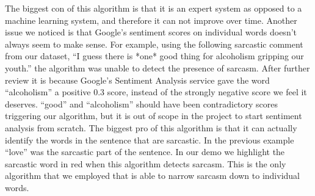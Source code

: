 \documentclass[conference]{IEEEtran}
\begin{document}
The biggest con of this algorithm is that it is an expert system as opposed to a machine learning system, and therefore it can not improve over time. Another issue we noticed is that Google’s sentiment scores on individual words doesn’t always seem to make sense. For example, using the following sarcastic comment from our dataset, “I guess there is *one* good thing for alcoholism gripping our youth.” the algorithm was unable to detect the presence of sarcasm. After further review it is because Google’s Sentiment Analysis service gave the word “alcoholism” a positive 0.3 score, instead of the strongly negative score we feel it deserves. “good” and “alcoholism” should have been contradictory scores triggering our algorithm, but it is out of scope in the project to start sentiment analysis from scratch. The biggest pro of this algorithm is that it can actually identify the words in the sentence that are sarcastic. In the previous example “love” was the sarcastic part of the sentence. In our demo we highlight the sarcastic word in red when this algorithm detects sarcasm. This is the only algorithm that we employed that is able to narrow sarcasm down to individual words. \\
\end{document}
